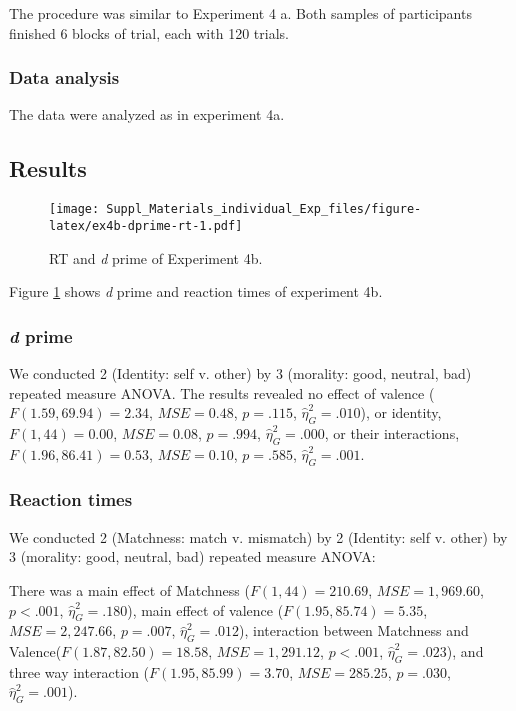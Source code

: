 \documentclass[
  english,
  man]{apa6}
\begin{document}
The procedure was similar to Experiment 4 a. Both samples of participants finished 6 blocks of trial, each with 120 trials.

\hypertarget{data-analysis-6}{%
\subsubsection{Data analysis}\label{data-analysis-6}}

The data were analyzed as in experiment 4a.

\hypertarget{results-7}{%
\subsection{Results}\label{results-7}}

\begin{figure}
\centering
\texttt{[image: Suppl\_Materials\_individual\_Exp\_files/figure-latex/ex4b-dprime-rt-1.pdf]}
\caption{\label{fig:ex4b-dprime-rt}RT and \emph{d} prime of Experiment 4b.}
\end{figure}

Figure \ref{fig:ex4b-dprime-rt} shows \emph{d} prime and reaction times of experiment 4b.

\hypertarget{d-prime-4}{%
\subsubsection{\texorpdfstring{\emph{d} prime}{d prime}}\label{d-prime-4}}

We conducted 2 (Identity: self v. other) by 3 (morality: good, neutral, bad) repeated measure ANOVA. The results revealed no effect of valence (\(F(1.59, 69.94) = 2.34\), \(\mathit{MSE} = 0.48\), \(p = .115\), \(\hat{\eta}^2_G = .010\)), or identity, \(F(1, 44) = 0.00\), \(\mathit{MSE} = 0.08\), \(p = .994\), \(\hat{\eta}^2_G = .000\), or their interactions, \(F(1.96, 86.41) = 0.53\), \(\mathit{MSE} = 0.10\), \(p = .585\), \(\hat{\eta}^2_G = .001\).

\hypertarget{reaction-times-1}{%
\subsubsection{Reaction times}\label{reaction-times-1}}

We conducted 2 (Matchness: match v. mismatch) by 2 (Identity: self v. other) by 3 (morality: good, neutral, bad) repeated measure ANOVA:

There was a main effect of Matchness (\(F(1, 44) = 210.69\), \(\mathit{MSE} = 1,969.60\), \(p < .001\), \(\hat{\eta}^2_G = .180\)), main effect of valence (\(F(1.95, 85.74) = 5.35\), \(\mathit{MSE} = 2,247.66\), \(p = .007\), \(\hat{\eta}^2_G = .012\)), interaction between Matchness and Valence(\(F(1.87, 82.50) = 18.58\), \(\mathit{MSE} = 1,291.12\), \(p < .001\), \(\hat{\eta}^2_G = .023\)), and three way interaction (\(F(1.95, 85.99) = 3.70\), \(\mathit{MSE} = 285.25\), \(p = .030\), \(\hat{\eta}^2_G = .001\)).
\end{document}
